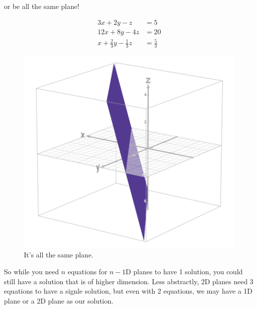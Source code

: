 \documentclass[12pt]{scrartcl}
\begin{document}
\begin{minipage}{0.48\textwidth}
    \begin{center}or be all the same plane!\end{center}
    \vspace{-1em}
    \begin{align*}
        3x + 2y - z &= 5 \\
        12x + 8y - 4z &= 20 \\
        x + \frac{2}{3}y - \frac{1}{3}z &= \frac{5}{3}
    \end{align*}
    \begin{figure}[H]
        \centering
        \includegraphics[scale=0.21]{All Just One Plane.png}
        \caption*{It's all the same plane.}
    \end{figure}
\end{minipage}

\newpage
So while you need $n$ equations for $n-1$D planes to have 1 solution, you could still have a solution that is of higher dimension. Less abstractly, 2D planes need 3 equations to have a signle solution, but even with 2 equations, we may have a 1D plane or a 2D plane as our solution.
\end{document}
